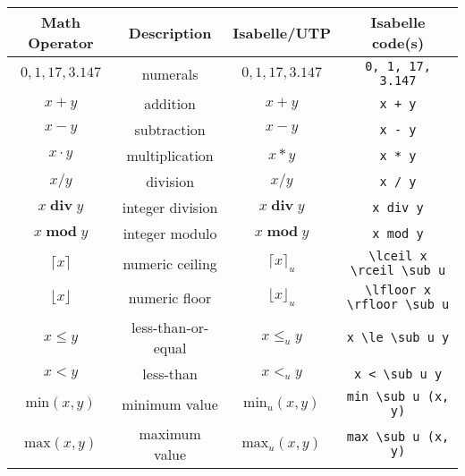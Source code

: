 \documentclass[11pt]{article}
\begin{document}
\begin{center}
\begin{tabular}{|c|c|c|c|} \hline
  \textbf{Math Operator}      & \textbf{Description}        & \textbf{Isabelle/UTP}       & \textbf{Isabelle code(s)} \\ \hline
  $0, 1, 17, 3.147$           & numerals                    & $0, 1, 17, 3.147$           & \verb|0, 1, 17, 3.147| \\
  $x + y$                     & addition                    & $x + y$                     & \verb|x + y| \\
  $x - y$                     & subtraction                 & $x - y$                     & \verb|x - y| \\
  $x \cdot y$                 & multiplication              & $x * y$                     & \verb|x * y| \\  
  $x / y$                     & division                    & $x / y$                     & \verb|x / y| \\
  $x \mathop{\textbf{div}} y$ & integer division            & $x \mathop{\textbf{div}} y$ & \verb|x div y| \\
  $x \mathop{\textbf{mod}} y$ & integer modulo              & $x \mathop{\textbf{mod}} y$ & \verb|x mod y| \\
  $\lceil x \rceil$           & numeric ceiling             & $\lceil x \rceil_u$         & \verb|\lceil x \rceil \sub u| \\
  $\lfloor x \rfloor$         & numeric floor               & $\lfloor x \rfloor_u$       & \verb|\lfloor x \rfloor \sub u| \\
  $x \le y$                   & less-than-or-equal          & $x \le_u y$                 & \verb|x \le \sub u y| \\
  $x < y$                     & less-than                   & $x <_u y$                   & \verb|x < \sub u y| \\
  $\textrm{min}(x, y)$        & minimum value               & $\textrm{min}_u(x, y)$      & \verb|min \sub u (x, y)| \\ 
  $\textrm{max}(x, y)$        & maximum value               & $\textrm{max}_u(x, y)$      & \verb|max \sub u (x, y)| \\ 
  \hline
\end{tabular}
\end{center}
\end{document}
